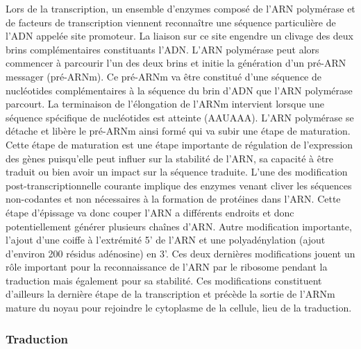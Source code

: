 Lors de la transcription, un ensemble d'enzymes composé de l'ARN polymérase et de facteurs de transcription viennent reconnaître une séquence particulière de l'ADN appelée site promoteur. La liaison sur ce site engendre un clivage des deux brins complémentaires constituants l'ADN. L'ARN polymérase peut alors commencer à parcourir l'un des deux brins et initie la génération d'un pré-ARN messager (pré-ARNm). Ce pré-ARNm va être constitué d'une séquence de nucléotides complémentaires à la séquence du brin d'ADN que l'ARN polymérase parcourt. La terminaison de l'élongation de l'ARNm intervient lorsque une séquence spécifique de nucléotides est atteinte (AAUAAA). L'ARN polymérase se détache et libère le pré-ARNm ainsi formé qui va subir une étape de maturation. Cette étape de maturation est une étape importante de régulation de l'expression des gènes puisqu'elle peut influer sur la stabilité de l'ARN, sa capacité à être traduit ou bien avoir un impact sur la séquence traduite. L'une des modification post-transcriptionnelle courante implique des enzymes venant cliver les séquences non-codantes et non nécessaires à la formation de protéines dans l'ARN. Cette étape d'épissage va donc couper l'ARN a différents endroits et donc potentiellement générer plusieurs chaînes d'ARN. Autre modification importante, l'ajout d'une coiffe à l'extrémité 5' de l'ARN et une polyadénylation (ajout d'environ 200 résidus adénosine) en 3'. Ces deux dernières modifications jouent un rôle important pour la reconnaissance de l'ARN par le ribosome pendant la traduction mais également pour sa stabilité. Ces modifications constituent d'ailleurs la dernière étape de la transcription et précède la sortie de l'ARNm mature du noyau pour rejoindre le cytoplasme de la cellule, lieu de la traduction.

\subsubsection{Traduction}

